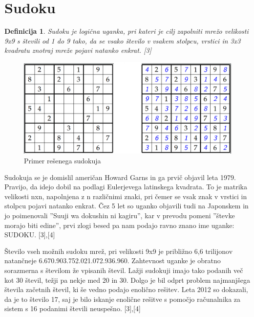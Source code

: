 \documentclass[A4paper, 11pt]{article}
\newtheorem{definicija}{Definicija}
\begin{document}

\section{Sudoku}

\begin{definicija}
Sudoku je logična uganka, pri kateri je cilj zapolniti mrežo velikosti 9x9 s števili od 1 do 9 tako, da se vsako število v vsakem stolpcu, vrstici in 3x3 kvadratu znotraj mreže pojavi natanko enkrat. [3]
\end{definicija}

\begin{figure}[h]
\centering
\caption{Primer rešenega sudokuja}
\includegraphics[scale=0.4]{sudoku_resen}
\end{figure}

Sudokuja se je domislil američan Howard Garns in ga prvič objavil leta 1979. Pravijo, da idejo dobil na podlagi Eulerjevega latinskega kvadrata. To je matrika velikosti nxn, napolnjena z n različnimi znaki, pri čemer se vsak znak v vrstici in stolpcu pojavi natanko enkrat. Čez 5 let so uganko objavili tudi na Japonskem in jo poimenovali ''Suuji wa dokushin ni kagiru'', kar v prevodu pomeni ''števke morajo biti edine'', prvi zlogi besed pa nam podajo ravno znano ime uganke: SUDOKU. [3],[4]


Število vseh možnih sudoku mrež, pri velikosti 9x9 je približno 6,6 trilijonov natančneje 6.670.903.752.021.072.936.960. 
Zahtevnost uganke je obratno sorazmerna s številom že vpisanih števil. Lažji sudokuji imajo tako podanih več kot 30 števil, težji pa nekje med 20 in 30. Dolgo je bil odprt problem najmanjšega števila začetnih števil, ki še vedno podajo enolično rešitev. Leta 2012 so dokazali, da je to število 17, saj je bilo iskanje enolične rešitve s pomočjo računalnika za sistem s 16 podanimi števili neuspešno. [3],[4]
\end{document}
